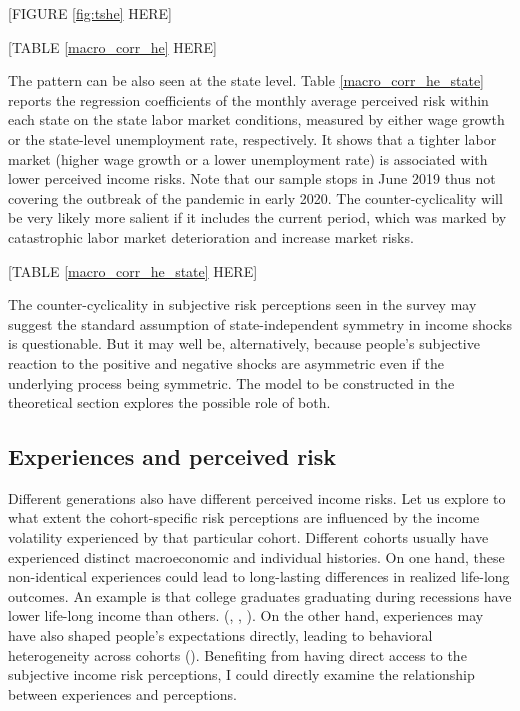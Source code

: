 \documentclass[12pt,notitlepage,onecolumn,aps,pra]{article}
\begin{document}
\begin{center}
[FIGURE \ref{fig:tshe} HERE]
\end{center}

\begin{center}
[TABLE \ref{macro_corr_he} HERE]
\end{center}

The pattern can be also seen at the state level. Table
\ref{macro_corr_he_state} reports the regression coefficients of the
monthly average perceived risk within each state on the state labor
market conditions, measured by either wage growth or the state-level
unemployment rate, respectively. It shows that a tighter labor market
(higher wage growth or a lower unemployment rate) is associated with
lower perceived income risks. Note that our sample stops in June 2019
thus not covering the outbreak of the pandemic in early 2020. The
counter-cyclicality will be very likely more salient if it includes the
current period, which was marked by catastrophic labor market
deterioration and increase market risks.

\begin{center}
[TABLE \ref{macro_corr_he_state} HERE]
\end{center}

The counter-cyclicality in subjective risk perceptions seen in the
survey may suggest the standard assumption of state-independent symmetry
in income shocks is questionable. But it may well be, alternatively,
because people's subjective reaction to the positive and negative shocks
are asymmetric even if the underlying process being symmetric. The model
to be constructed in the theoretical section explores the possible role
of both.




    \hypertarget{experiences-and-perceived-risk}{%
\subsection{Experiences and perceived
risk}\label{experiences-and-perceived-risk}}

Different generations also have different perceived income risks. Let us
explore to what extent the cohort-specific risk perceptions are
influenced by the income volatility experienced by that particular
cohort. Different cohorts usually have experienced distinct
macroeconomic and individual histories. On one hand, these non-identical
experiences could lead to long-lasting differences in realized life-long
outcomes. An example is that college graduates graduating during
recessions have lower life-long income than others.
(\cite{kahn2010long}, \cite{oreopoulos2012short},
\cite{schwandt2019unlucky}). On the other hand, experiences may have
also shaped people's expectations directly, leading to behavioral
heterogeneity across cohorts (\cite{malmendier2015learning}). Benefiting
from having direct access to the subjective income risk perceptions, I
could directly examine the relationship between experiences and
perceptions.
\end{document}
